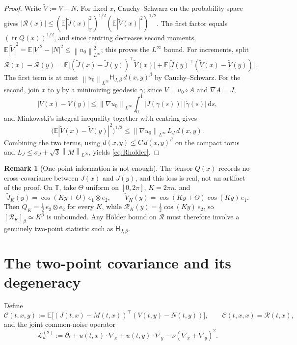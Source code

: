 \documentclass[11pt,reqno]{amsart}
\newcommand{\T}{\mathbb{T}}
\newcommand{\E}{\mathbb{E}}
\newcommand{\dd}{\,\mathrm{d}}
\newcommand{\norm}[1]{\left\lVert #1\right\rVert}
\newcommand{\abs}[1]{\left\lvert #1\right\rvert}
\DeclareMathOperator{\tr}{tr}
\theoremstyle{definition}
\newtheorem{remark}[theorem]{Remark}
\begin{document}
\begin{proof}
Write $\widetilde V:=V-N$. For fixed $x$, Cauchy--Schwarz on the probability space gives
$\abs{\mathcal R(x)}\le(\E\abs{\widetilde J(x)}_{\mathrm F}^2)^{1/2}
(\E\abs{\widetilde V(x)}^2)^{1/2}$. The first factor equals $(\tr Q(x))^{1/2}$, and since
centring decreases second moments,
$\E\abs{\widetilde V}^2=\E\abs V^2-\abs N^2\le\norm{u_0}_{L^\infty}^2$; this proves the
$L^\infty$ bound. For increments, split
\[
  \mathcal R(x)-\mathcal R(y)
  =\E\bigl[(\widetilde J(x)-\widetilde J(y))^\top\widetilde V(x)\bigr]
  +\E\bigl[\widetilde J(y)^\top(\widetilde V(x)-\widetilde V(y))\bigr].
\]
The first term is at most $\norm{u_0}_{L^\infty}\mathsf H_{J,\beta}\,d(x,y)^\beta$ by
Cauchy--Schwarz. For the second, join $x$ to $y$ by a minimizing geodesic $\gamma$; since
$V=u_0\circ A$ and $\nabla A=J$,
\[
  \abs{V(x)-V(y)}\le\norm{\nabla u_0}_{L^\infty}\int_0^1\abs{J(\gamma(s))}\,\abs{\dot\gamma(s)}\dd s ,
\]
and Minkowski's integral inequality together with centring gives
\[
  \bigl(\E\abs{\widetilde V(x)-\widetilde V(y)}^2\bigr)^{1/2}
  \le\norm{\nabla u_0}_{L^\infty}\,L_J\,d(x,y) .
\]
Combining the two terms, using $d(x,y)\le C\,d(x,y)^\beta$ on the compact torus and
$L_J\le\sigma_J+\sqrt3\norm M_{L^\infty}$, yields \eqref{eq:Rholder}.
\end{proof}

\begin{remark}[One-point information is not enough]\label{rem:onepoint}
The tensor $Q(x)$ records no cross-covariance between $J(x)$ and $J(y)$, and this loss is
real, not an artifact of the proof. On $\T$, take $\Theta$ uniform on $[0,2\pi]$,
$K=2\pi n$, and
\[
  \widetilde J_K(y)=\cos(Ky+\Theta)\,e_1\otimes e_2,\qquad
  \widetilde V_K(y)=\cos(Ky+\Theta)\cos(Ky)\,e_1 .
\]
Then $Q_K=\tfrac12\,e_2\otimes e_2$ for every $K$, while
$\mathcal R_K(y)=\tfrac12\cos(Ky)\,e_2$, so $[\mathcal R_K]_\beta\simeq K^\beta$ is
unbounded. Any H\"older bound on $\mathcal R$ must therefore involve a genuinely two-point
statistic such as $\mathsf H_{J,\beta}$.
\end{remark}

\section{The two-point covariance and its degeneracy}\label{sec:twopoint}

Define
\[
  \mathcal C(t,x,y):=\E\bigl[(J(t,x)-M(t,x))^\top(V(t,y)-N(t,y))\bigr],
  \qquad \mathcal C(t,x,x)=\mathcal R(t,x),
\]
and the joint common-noise operator
\[
  \mathcal L_u^{(2)}:=\partial_t+u(t,x)\cdot\nabla_x+u(t,y)\cdot\nabla_y
  -\nu(\nabla_x+\nabla_y)^2 .
\]
\end{document}
